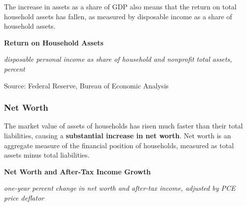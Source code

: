 \documentclass{report}
\makeatletter
\newcommand{\tbllink}[1]{\href{https://raw.githubusercontent.com/bdecon/US-chartbook/master/chartbook/data/#1}{\faTable}}
\newcommand*\short[1]{\expandafter\@gobbletwo\number\numexpr#1\relax}
\newcommand{\sbar}[4]{
		\addplot[ybar stacked, bar width=2.6pt, draw opacity=0, fill=#1] 
			table [x=#2, y=#3, col sep=comma]{#4};}
\newcommand{\dateaxisticks}{
		date coordinates in=x, axis line style={draw=none},
		xmax={2020-08-10},
		max space between ticks=40,	    
		xtick={{1990-01-01}, {1992-01-01}, {1994-01-01}, 
			{1996-01-01}, {1998-01-01}, {2000-01-01}, 
			{2002-01-01}, {2004-01-01}, {2006-01-01},
			{2008-01-01}, {2010-01-01}, {2012-01-01}, {2014-01-01},
		    {2016-01-01}, {2018-01-01}, {2020-01-01}},
		minor xtick={{1989-01-01}, {1991-01-01}, {1993-01-01},
			{1995-01-01}, {1997-01-01}, {1999-01-01}, 
			{2001-01-01}, {2003-01-01}, {2005-01-01}, {2007-01-01},
		    {2009-01-01}, {2011-01-01}, {2013-01-01}, {2015-01-01},
		    {2017-01-01}, {2019-01-01}},
		enlarge y limits={0.06}, enlarge x limits={0.01},
		}
\newcommand{\bbar}[2]{extra #1 ticks = {{#2}}, extra #1 tick labels = ,
		extra #1 tick style = {grid=major, grid style={thick, black!25}},}
\newcommand{\stdline}[4]{\addplot[very thick, no markers, color=#1] 
		table [x=#2, y=#3, col sep=comma] {#4};	}
\newcommand{\rbars}{
		\fill[color=black!10] (axis cs:{1990-07-01},\pgfkeysvalueof{/pgfplots/ymin}) rectangle 
			(axis cs:{1991-03-01}, \pgfkeysvalueof{/pgfplots/ymax});
		\fill[color=black!10] (axis cs:{2007-12-01},\pgfkeysvalueof{/pgfplots/ymin}) rectangle 
			(axis cs:{2009-07-01}, \pgfkeysvalueof{/pgfplots/ymax});
		\fill[color=black!10] (axis cs:{2001-03-01},\pgfkeysvalueof{/pgfplots/ymin}) rectangle 
			(axis cs:{2001-11-01}, \pgfkeysvalueof{/pgfplots/ymax});
		\fill[color=black!10] (axis cs:{2020-02-01},\pgfkeysvalueof{/pgfplots/ymin}) rectangle 
			(axis cs:{2020-09-01}, \pgfkeysvalueof{/pgfplots/ymax});}
\makeatother
\begin{document}
{{{\begin{minipage}{0.76\textwidth}
\small The increase in assets as a share of GDP also means that the return on total household assets has fallen, as measured by disposable income as a share of household assets.  

\vspace{4mm}

\normalsize \textbf{Return on Household Assets}

\footnotesize{\textit{disposable personal income as share of household and nonprofit total assets, percent}}

\hspace*{-2mm} 

\footnotesize{Source: Federal Reserve, Bureau of Economic Analysis} \hfill \tbllink{dpish.csv}
\end{minipage}
\newpage
\begin{minipage}{0.76\textwidth}
\subsubsection*{\color{black!70} \seriffont Net Worth}
\small The market value of assets of households has risen much faster than their total liabilities, causing a \textbf{substantial increase in net worth}. Net worth is an aggregate measure of the financial position of households, measured as total assets minus total liabilities.  \\



\vspace{5mm}

\normalsize \textbf{Net Worth and After-Tax Income Growth}

\footnotesize{\textit{one-year percent change in net worth and after-tax income, adjusted by PCE price deflator}}

\hspace*{-3mm} 


\end{minipage}}}}
\end{document}
